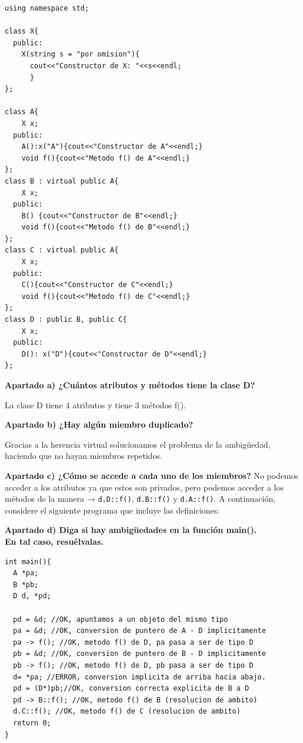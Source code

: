 \begin{lstlisting}[frame = single]
using namespace std;

class X{
  public:
    X(string s = "por omision"){
      cout<<"Constructor de X: "<<s<<endl;
      }
};

class A{
    X x;
  public:
    A():x("A"){cout<<"Constructor de A"<<endl;}
    void f(){cout<<"Metodo f() de A"<<endl;}
};
class B : virtual public A{
    X x;
  public:
    B() {cout<<"Constructor de B"<<endl;}
    void f(){cout<<"Metodo f() de B"<<endl;}
};
class C : virtual public A{
    X x;
  public:
    C(){cout<<"Constructor de C"<<endl;}
    void f(){cout<<"Metodo f() de C"<<endl;}
};
class D : public B, public C{
    X x;
  public:
    D(): x("D"){cout<<"Constructor de D"<<endl;}
};
\end{lstlisting}
\textbf{\large Apartado a) ¿Cuántos atributos y métodos tiene la clase D?}

La clase D tiene 4 atributos y tiene 3 métodos f().

\textbf{\large Apartado b) ¿Hay algún miembro duplicado?}

Gracias a la herencia virtual solucionamos el problema de la ambigüedad, haciendo que no hayan miembros repetidos.

\textbf{\large Apartado c) ¿Cómo se accede a cada uno de los miembros?}
No podemos acceder a los atributos ya que estos son privados, pero podemos acceder a los métodos de la manera → \texttt{d.D::f()}, \texttt{d.B::f()} y \texttt{d.A::f()}.
\newpage
A continuación, considere el siguiente programa que incluye las definiciones:

\textbf{\large Apartado d) Diga si hay ambigüedades en la función main().\\En tal caso, resuélvalas.}
\begin{lstlisting}[frame=single]
int main(){
  A *pa;
  B *pb;
  D d, *pd;
  
  pd = &d; //OK, apuntamos a un objeto del mismo tipo
  pa = &d; //OK, conversion de puntero de A - D implicitamente
  pa -> f(); //OK, metodo f() de D, pa pasa a ser de tipo D
  pb = &d; //OK, conversion de puntero de B - D implicitamente
  pb -> f(); //OK, metodo f() de D, pb pasa a ser de tipo D
  d= *pa; //ERROR, conversion implicita de arriba hacia abajo.
  pd = (D*)pb;//OK, conversion correcta explicita de B a D
  pd -> B::f(); //OK, metodo f() de B (resolucion de ambito)
  d.C::f(); //OK, metodo f() de C (resolucion de ambito)
  return 0;
}
\end{lstlisting}

